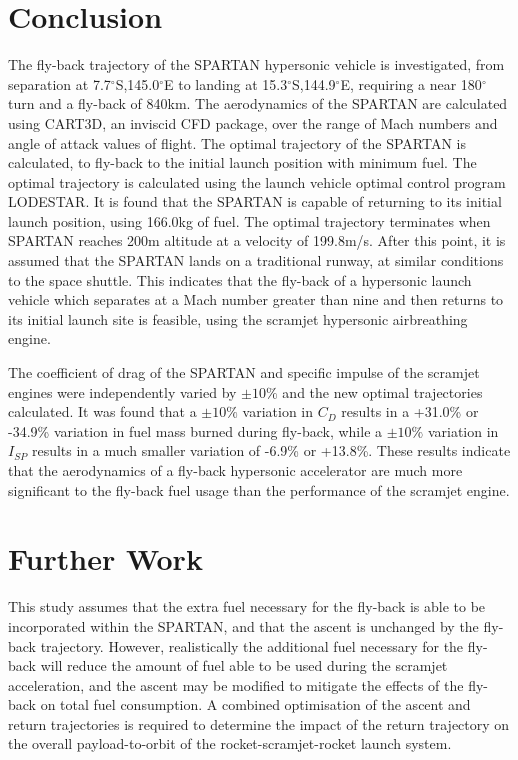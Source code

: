 \documentclass[conf]{new-aiaa}
\begin{document}
\section{Conclusion}
The fly-back trajectory of the SPARTAN hypersonic vehicle is investigated, from separation at 7.7$^\circ$S,145.0$^\circ$E to landing at 15.3$^\circ$S,144.9$^\circ$E, requiring a near 180$^\circ$ turn and a fly-back of 840km. The aerodynamics of the SPARTAN are calculated using CART3D, an inviscid CFD package, over the range of Mach numbers and angle of attack values of flight. The optimal trajectory of the SPARTAN is calculated, to fly-back to the initial launch position with minimum fuel. The optimal trajectory is calculated using the launch vehicle optimal control program LODESTAR. It is found that the SPARTAN is capable of returning to its initial launch position, using 166.0kg of fuel. The optimal trajectory terminates when SPARTAN reaches 200m altitude at a velocity of 199.8m/s. After this point, it is assumed that the SPARTAN lands on a traditional runway, at similar conditions to the space shuttle.  
This indicates that the fly-back of a hypersonic launch vehicle which separates at a Mach number greater than nine and then returns to its initial launch site is feasible, using the scramjet hypersonic airbreathing engine. 

The coefficient of drag of the SPARTAN and specific impulse of the scramjet engines were independently varied by $\pm10\%$ and the new optimal trajectories calculated. It was found that a $\pm10\%$ variation in $C_D$ results in a +31.0\% or -34.9\% variation in fuel mass burned during fly-back, while a $\pm10\%$ variation in $I_{SP}$ results in a much smaller variation of -6.9\% or +13.8\%. These results indicate that the aerodynamics of a fly-back hypersonic accelerator are much more significant to the fly-back fuel usage than the performance of the scramjet engine. 

\section{Further Work}
This study assumes that the extra fuel necessary for the fly-back is able to be incorporated within the SPARTAN, and that the ascent is unchanged by the fly-back trajectory. However, realistically the additional fuel necessary for the fly-back will reduce the amount of fuel able to be used during the scramjet acceleration, and the ascent may be modified to mitigate the effects of the fly-back on total fuel consumption. A combined optimisation of the ascent and return trajectories is required to determine the impact of the return trajectory on the overall payload-to-orbit of the rocket-scramjet-rocket launch system. 


\end{document}
